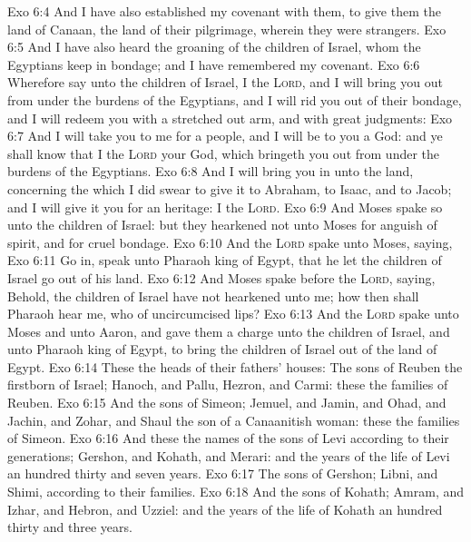 \vs Exo 6:4 And I have also established my covenant with them, to give them the land of Canaan, the land of their pilgrimage, wherein they were strangers.
\vs Exo 6:5 And I have also heard the groaning of the children of Israel, whom the Egyptians keep in bondage; and I have remembered my covenant.
\vs Exo 6:6 Wherefore say unto the children of Israel, I  the \textsc{Lord}, and I will bring you out from under the burdens of the Egyptians, and I will rid you out of their bondage, and I will redeem you with a stretched out arm, and with great judgments:
\vs Exo 6:7 And I will take you to me for a people, and I will be to you a God: and ye shall know that I  the \textsc{Lord} your God, which bringeth you out from under the burdens of the Egyptians.
\vs Exo 6:8 And I will bring you in unto the land, concerning the which I did swear to give it to Abraham, to Isaac, and to Jacob; and I will give it you for an heritage: I  the \textsc{Lord}.
\vs Exo 6:9 And Moses spake so unto the children of Israel: but they hearkened not unto Moses for anguish of spirit, and for cruel bondage.
\vs Exo 6:10 And the \textsc{Lord} spake unto Moses, saying,
\vs Exo 6:11 Go in, speak unto Pharaoh king of Egypt, that he let the children of Israel go out of his land.
\vs Exo 6:12 And Moses spake before the \textsc{Lord}, saying, Behold, the children of Israel have not hearkened unto me; how then shall Pharaoh hear me, who  of uncircumcised lips?
\vs Exo 6:13 And the \textsc{Lord} spake unto Moses and unto Aaron, and gave them a charge unto the children of Israel, and unto Pharaoh king of Egypt, to bring the children of Israel out of the land of Egypt.
\vs Exo 6:14 These  the heads of their fathers' houses: The sons of Reuben the firstborn of Israel; Hanoch, and Pallu, Hezron, and Carmi: these  the families of Reuben.
\vs Exo 6:15 And the sons of Simeon; Jemuel, and Jamin, and Ohad, and Jachin, and Zohar, and Shaul the son of a Canaanitish woman: these  the families of Simeon.
\vs Exo 6:16 And these  the names of the sons of Levi according to their generations; Gershon, and Kohath, and Merari: and the years of the life of Levi  an hundred thirty and seven years.
\vs Exo 6:17 The sons of Gershon; Libni, and Shimi, according to their families.
\vs Exo 6:18 And the sons of Kohath; Amram, and Izhar, and Hebron, and Uzziel: and the years of the life of Kohath  an hundred thirty and three years.
